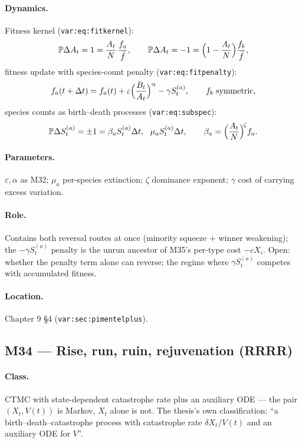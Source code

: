 \documentclass[11pt,a4paper]{article}
\newcommand{\PR}{\mathbb{P}}
\begin{document}
\paragraph{Dynamics.} Fitness kernel (\texttt{var:eq:fitkernel}):
\[
\PR{\Delta A_t=1}=\frac{A_t}{N}\,\frac{f_a}{\bar f},\qquad
\PR{\Delta A_t=-1}=\Bigl(1-\frac{A_t}{N}\Bigr)\frac{f_b}{\bar f},
\]
fitness update with species-count penalty (\texttt{var:eq:fitpenalty}):
\[
f_a(t+\Delta t)=f_a(t)+\varepsilon\Bigl(\frac{B_t}{A_t}\Bigr)^{\alpha}
-\gamma S^{(a)}_t,\qquad
f_b \text{ symmetric},
\]
species counts as birth--death processes (\texttt{var:eq:subspec}):
\[
\PR{\Delta S^{(a)}_t=\pm1}=\beta_aS^{(a)}_t\Delta t,\ \ \mu_aS^{(a)}_t
\Delta t,\qquad
\beta_a=\Bigl(\frac{A_t}{N}\Bigr)^{\!\zeta}f_a .
\]

\paragraph{Parameters.} $\varepsilon,\alpha$ as M32; $\mu_a$ per-species
extinction; $\zeta$ dominance exponent; $\gamma$ cost of carrying excess
variation.

\paragraph{Role.} Contains both reversal routes at once (minority squeeze
$+$ winner weakening); the $-\gamma S^{(a)}_t$ penalty is the unrun
ancestor of M35's per-type cost $-cX_i$. Open: whether the penalty term
alone can reverse; the regime where $\gamma S^{(a)}_t$ competes with
accumulated fitness.

\paragraph{Location.} Chapter 9 \S4 (\texttt{var:sec:pimentelplus}).

\subsection{M34 --- Rise, run, ruin, rejuvenation (RRRR)}

\paragraph{Class.} CTMC with state-dependent catastrophe rate plus an
auxiliary ODE --- the pair $(X_t,V(t))$ is Markov, $X_t$ alone is not.
The thesis's own classification: ``a birth--death--catastrophe process with
catastrophe rate $\delta X_t/V(t)$ and an auxiliary ODE for $V$''.
\end{document}
